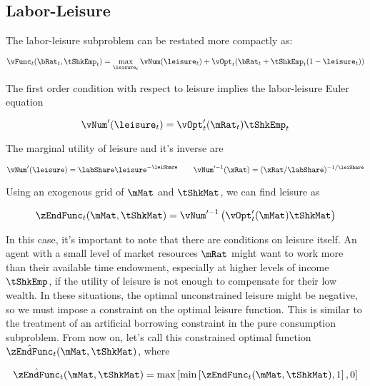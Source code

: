 \documentclass[\econtexRoot/SequentialEGM]{subfiles}
\begin{document}
\subsection{Labor-Leisure}

The labor-leisure subproblem can  be restated more compactly as:

\begin{equation}
    \vFunc_{t}(\bRat_{t}, \tShkEmp_{t}) = \max_{ \leisure_{t}}
    \vNum(\leisure_{t}) + \vOpt_{t}(\bRat_{t} +
    \tShkEmp_{t}(1-\leisure_{t}))
\end{equation}

The first order condition with respect to leisure implies the labor-leisure Euler equation

\begin{equation}
    \vNum'(\leisure_{t}) =	\vOpt_{t}'(\mRat_{t}) \tShkEmp_{t}
\end{equation}

The marginal utility of leisure and it's inverse are

\begin{equation}
    \vNum'(\leisure) = \labShare\leisure^{-\leiShare} \qquad
    \vNum'^{-1}(\xRat) = (\xRat/\labShare)^{-1/\leiShare}
\end{equation}

Using an exogenous grid of $\mMat$ and $\tShkMat$, we can find leisure as

\begin{equation}
    \zEndFunc_{t}(\mMat, \tShkMat) = \vNum'^{-1}\left(
    \vOpt_{t}'(\mMat) \tShkMat \right)
\end{equation}

In this case, it's important to note that there are conditions on leisure itself. An agent with a small level of market resources $\mRat$ might want to work more than their available time endowment, especially at higher levels of income $\tShkEmp$, if the utility of leisure is not enough to compensate for their low wealth. In these situations, the optimal unconstrained leisure might be negative, so we must impose a constraint on the optimal leisure function. This is similar to the treatment of an artificial borrowing constraint in the pure consumption subproblem. From now on, let's call this constrained optimal function $\hat{\zEndFunc}_{t}(\mMat, \tShkMat)$, where

\begin{equation}
    \hat{\zEndFunc}_{t}(\mMat, \tShkMat) = \max \left[ \min \left[ \zEndFunc_{t}(\mMat, \tShkMat), 1 \right], 0 \right]
\end{equation}
\end{document}
